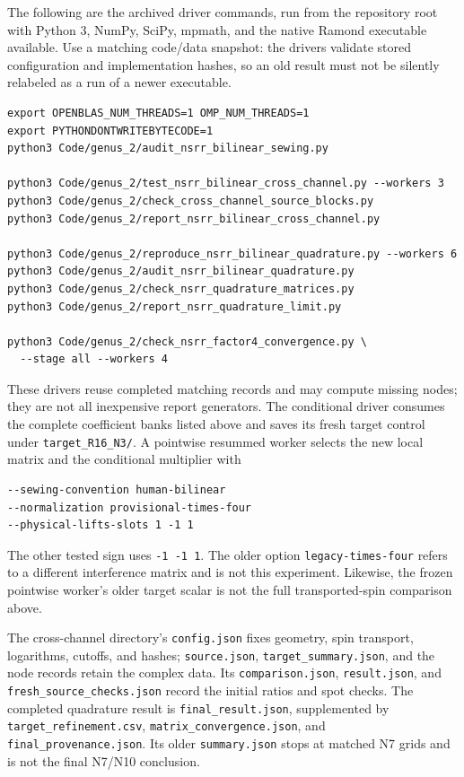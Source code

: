 The following are the archived driver commands, run from the
repository root with Python 3, NumPy, SciPy, mpmath, and the
native Ramond executable available. Use a matching code/data
snapshot: the drivers validate stored configuration and
implementation hashes, so an old result must not be silently
relabeled as a run of a newer executable.
\begin{verbatim}
export OPENBLAS_NUM_THREADS=1 OMP_NUM_THREADS=1
export PYTHONDONTWRITEBYTECODE=1
python3 Code/genus_2/audit_nsrr_bilinear_sewing.py

python3 Code/genus_2/test_nsrr_bilinear_cross_channel.py --workers 3
python3 Code/genus_2/check_cross_channel_source_blocks.py
python3 Code/genus_2/report_nsrr_bilinear_cross_channel.py

python3 Code/genus_2/reproduce_nsrr_bilinear_quadrature.py --workers 6
python3 Code/genus_2/audit_nsrr_bilinear_quadrature.py
python3 Code/genus_2/check_nsrr_quadrature_matrices.py
python3 Code/genus_2/report_nsrr_quadrature_limit.py

python3 Code/genus_2/check_nsrr_factor4_convergence.py \
  --stage all --workers 4
\end{verbatim}
These drivers reuse completed matching records and may compute
missing nodes; they are not all inexpensive report generators.
The conditional driver consumes the complete coefficient banks
listed above and saves its fresh target control under
\texttt{target\_R16\_N3/}. A pointwise resummed worker selects
the new local matrix and the conditional multiplier with
\begin{verbatim}
--sewing-convention human-bilinear
--normalization provisional-times-four
--physical-lifts-slots 1 -1 1
\end{verbatim}
The other tested sign uses \texttt{-1 -1 1}. The older option
\texttt{legacy-times-four} refers to a different interference
matrix and is not this experiment. Likewise, the frozen
pointwise worker's older target scalar is not the full
transported-spin comparison above.

The cross-channel directory's \texttt{config.json} fixes
geometry, spin transport, logarithms, cutoffs, and hashes;
\texttt{source.json}, \texttt{target\_summary.json}, and the
node records retain the complex data. Its
\texttt{comparison.json}, \texttt{result.json}, and
\texttt{fresh\_source\_checks.json} record the initial ratios
and spot checks. The completed quadrature result is
\texttt{final\_result.json}, supplemented by
\texttt{target\_refinement.csv}, \texttt{matrix\_convergence.json},
and \texttt{final\_provenance.json}. Its older
\texttt{summary.json} stops at matched N7 grids and is not
the final N7/N10 conclusion.

